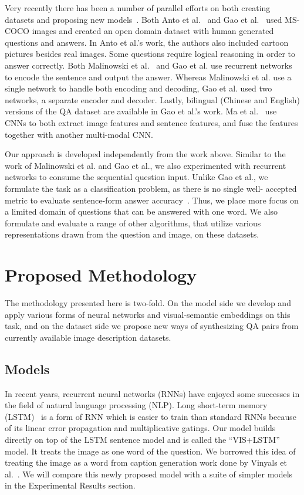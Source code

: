 \documentclass{article} %
\renewcommand{\#}[1]{\textbf{#1}}
\begin{document}
Very recently there has been a number of parallel efforts on both creating
datasets and proposing new models~\cite{antol14, malinowski15, gao15, ma15}.
Both Anto et al.~\cite{antol14} and Gao et al.~\cite{gao15} used MS-COCO
\cite{mscoco} images and created an open domain dataset with human generated
questions and answers. In Anto et al.'s work, the authors also included cartoon
pictures besides real images. Some questions require logical reasoning in order
to answer correctly. Both Malinowski et al.~\cite{malinowski15} and Gao et al.
\cite{gao15} use recurrent networks to encode the sentence and output the
answer. Whereas Malinowski et al. use a single network to handle both encoding
and decoding, Gao et al. used two networks, a separate encoder and decoder.
Lastly, bilingual (Chinese and English) versions of the QA dataset are
available in Gao et al.'s work. Ma et al.~\cite{ma15} use CNNs to both extract
image features and sentence features, and fuse the features together with
another multi-modal CNN.

Our approach is developed independently from the work above. Similar to the
work of Malinowski et al. and Gao et al., we also experimented with recurrent
networks to consume the sequential question input. Unlike Gao et al., we
formulate the task as a classification problem, as there is no single well-
accepted metric to evaluate sentence-form answer
accuracy~\cite{mscoco_captions}. Thus, we place more focus on a limited domain
of questions that can be answered with one word. We also formulate and evaluate
a range of other algorithms, that utilize various representations drawn from
the question and image, on these datasets.

\section{Proposed Methodology}

The methodology presented here is two-fold. On the model side we develop and
apply various forms of neural networks and visual-semantic embeddings on this
task, and on the dataset side we propose new ways of synthesizing QA pairs from
currently available image description datasets.

\subsection{Models}

In recent years, recurrent neural networks (RNNs) have enjoyed some successes
in the field of natural language processing (NLP). Long short-term memory
(LSTM)~\cite{hochreiter97} is a form of RNN which is easier to train than
standard RNNs because of its linear error propagation and multiplicative
gatings. Our model builds directly on top of the LSTM sentence model and is
called the ``VIS+LSTM'' model. It treats the image as one word of the question.
We borrowed this idea of treating the image as a word from caption generation
work done by Vinyals et al.~\cite{vinyals14}. We will compare this newly
proposed model with a suite of simpler models in the Experimental Results
section.
\end{document}
